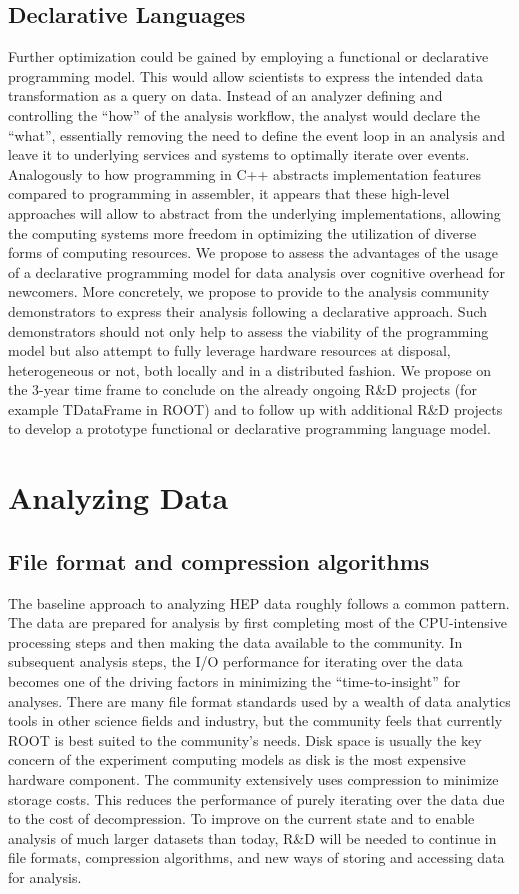 \documentclass[12pt,a4paper]{article}
\begin{document}
\subsection{Declarative Languages} 
Further optimization could be gained by employing a functional or declarative programming model. This would allow scientists to express the intended data transformation as a query on data. Instead of an analyzer defining and controlling the ``how'' of the analysis workflow, the analyst would declare the ``what'', essentially removing the need to define the event loop in an analysis and leave it to underlying services and systems to optimally iterate over events. Analogously to how programming in C++ abstracts implementation features compared to programming in assembler, it appears that these high-level approaches will allow to abstract from the underlying implementations, allowing the computing systems more freedom in optimizing the utilization of diverse forms of computing resources. We propose to assess the advantages of the usage of a declarative programming model for data analysis over cognitive overhead for newcomers. More concretely, we propose to provide to the analysis community demonstrators to express their analysis following a declarative approach. Such demonstrators should not only help to assess the viability of the programming model but also attempt to fully leverage hardware resources at disposal, heterogeneous or not, both locally and in a distributed fashion. We propose on the 3-year time frame to conclude on the already ongoing R\&D projects (for example TDataFrame in ROOT) and to follow up with additional R\&D projects to develop a prototype functional or declarative programming language model. 

\section{Analyzing Data}

\subsection{File format and compression algorithms} 
The baseline approach to analyzing HEP data roughly follows a common pattern. The data are prepared for analysis by first completing most of the CPU-intensive processing steps and then making the data available to the community. In subsequent analysis steps, the I/O performance for iterating over the data becomes one of the driving factors in minimizing the ``time-to-insight'' for analyses. There are many file format standards used by a wealth of data analytics tools in other science fields and industry, but the community feels that currently ROOT is best suited to the community's needs. Disk space is usually the key concern of the experiment computing models as disk is the most expensive hardware component. The community extensively uses compression to minimize storage costs. This reduces the performance of purely iterating over the data due to the cost of decompression. To improve on the current state and to enable analysis of much larger datasets than today, R\&D will be needed to continue in file formats, compression algorithms, and new ways of storing and accessing data for analysis. 
\end{document}
